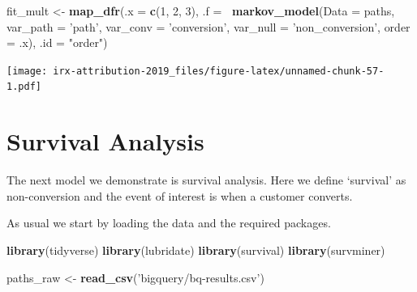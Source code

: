 \documentclass[]{book}
\newenvironment{Shaded}{\begin{snugshade}}{\end{snugshade}}
\newcommand{\DataTypeTok}[1]{\textcolor[rgb]{0.13,0.29,0.53}{#1}}
\newcommand{\DecValTok}[1]{\textcolor[rgb]{0.00,0.00,0.81}{#1}}
\newcommand{\KeywordTok}[1]{\textcolor[rgb]{0.13,0.29,0.53}{\textbf{#1}}}
\newcommand{\NormalTok}[1]{#1}
\newcommand{\OperatorTok}[1]{\textcolor[rgb]{0.81,0.36,0.00}{\textbf{#1}}}
\newcommand{\StringTok}[1]{\textcolor[rgb]{0.31,0.60,0.02}{#1}}
\begin{document}
\begin{Shaded}
\begin{Highlighting}[]
\NormalTok{fit_mult <-}\StringTok{ }\KeywordTok{map_dfr}\NormalTok{(}\DataTypeTok{.x =} \KeywordTok{c}\NormalTok{(}\DecValTok{1}\NormalTok{, }\DecValTok{2}\NormalTok{, }\DecValTok{3}\NormalTok{), }
                    \DataTypeTok{.f =} \OperatorTok{~}\KeywordTok{markov_model}\NormalTok{(}\DataTypeTok{Data =}\NormalTok{ paths, }
                                       \DataTypeTok{var_path =} \StringTok{'path'}\NormalTok{, }
                                       \DataTypeTok{var_conv =} \StringTok{'conversion'}\NormalTok{, }
                                       \DataTypeTok{var_null =} \StringTok{'non_conversion'}\NormalTok{, }
                                       \DataTypeTok{order =}\NormalTok{ .x), }
                    \DataTypeTok{.id =} \StringTok{"order"}\NormalTok{)}
\end{Highlighting}
\end{Shaded}

\texttt{[image: irx-attribution-2019\_files/figure-latex/unnamed-chunk-57-1.pdf]}

\hypertarget{survival-analysis}{%
\section{Survival Analysis}\label{survival-analysis}}

The next model we demonstrate is survival analysis. Here we define `survival'
as non-conversion and the event of interest is when a customer converts.

As usual we start by loading the data and the required packages.

\begin{Shaded}
\begin{Highlighting}[]
\KeywordTok{library}\NormalTok{(tidyverse)}
\KeywordTok{library}\NormalTok{(lubridate)}
\KeywordTok{library}\NormalTok{(survival)}
\KeywordTok{library}\NormalTok{(survminer)}

\NormalTok{paths_raw <-}\StringTok{ }\KeywordTok{read_csv}\NormalTok{(}\StringTok{'bigquery/bq-results.csv'}\NormalTok{)}
\end{Highlighting}
\end{Shaded}
\end{document}
